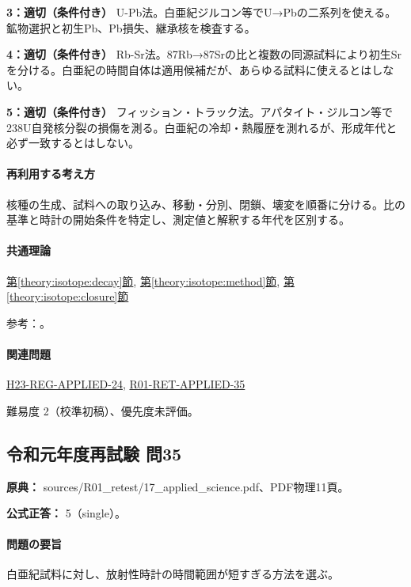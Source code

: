 \noindent\textbf{3：適切（条件付き）} U-Pb法。白亜紀ジルコン等でU→Pbの二系列を使える。鉱物選択と初生Pb、Pb損失、継承核を検査する。\par

\noindent\textbf{4：適切（条件付き）} Rb-Sr法。87Rb→87Srの比と複数の同源試料により初生Srを分ける。白亜紀の時間自体は適用候補だが、あらゆる試料に使えるとはしない。\par

\noindent\textbf{5：適切（条件付き）} フィッション・トラック法。アパタイト・ジルコン等で238U自発核分裂の損傷を測る。白亜紀の冷却・熱履歴を測れるが、形成年代と必ず一致するとはしない。\par

\paragraph{再利用する考え方} 核種の生成、試料への取り込み、移動・分別、閉鎖、壊変を順番に分ける。比の基準と時計の開始条件を特定し、測定値と解釈する年代を区別する。

\paragraph{共通理論} \hyperref[theory:isotope:decay]{第\ref*{theory:isotope:decay}節}, \hyperref[theory:isotope:method]{第\ref*{theory:isotope:method}節}, \hyperref[theory:isotope:closure]{第\ref*{theory:isotope:closure}節}

\par 参考：\cite{iso_radiometric,iso_zircon}。

\paragraph{関連問題} \hyperref[q:h23-reg-applied-24]{H23-REG-APPLIED-24}, \hyperref[q:r01-ret-applied-35]{R01-RET-APPLIED-35}

\par 難易度 2（校準初稿）、優先度未評価。

\subsection{令和元年度再試験 問35}
\label{q:r01-ret-applied-35}

\noindent\textbf{原典：} sources/R01\_retest/17\_applied\_science.pdf、PDF物理11頁。

\textbf{公式正答：} 5（single）。

\paragraph{問題の要旨} 白亜紀試料に対し、放射性時計の時間範囲が短すぎる方法を選ぶ。

